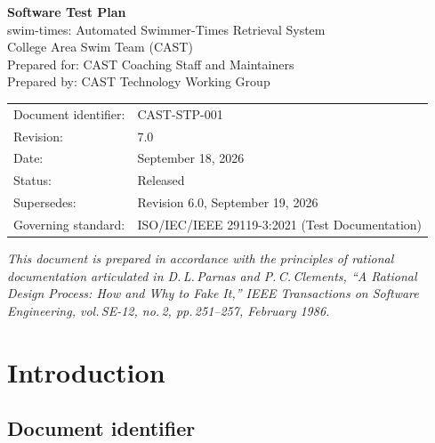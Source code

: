 \documentclass[12pt]{article}
\begin{document}
\begin{titlepage}
  \centering
  \vspace*{2cm}
  {\Huge\bfseries\color{castblue} Software Test Plan\\[0.5em]}
  {\Large swim-times: Automated Swimmer-Times Retrieval System}\\[2em]
  {\large College Area Swim Team (CAST)}\\[0.5em]
  {\normalsize Prepared for: CAST Coaching Staff and Maintainers}\\[0.5em]
  {\normalsize Prepared by: CAST Technology Working Group}\\[2em]
  \begin{tabular}{ll}
    Document identifier: & CAST-STP-001                                       \\
    Revision:            & 7.0                                                \\
    Date:                & September 18, 2026                                 \\
    Status:              & Released                                           \\
    Supersedes:          & Revision 6.0, September 19, 2026                    \\
    Governing standard:  & ISO/IEC/IEEE 29119-3:2021 (Test Documentation)     \\
  \end{tabular}
  \vfill
  {\small\textit{This document is prepared in accordance with the principles
  of rational documentation articulated in D.\,L.\,Parnas and P.\,C.\,Clements,
  ``A Rational Design Process: How and Why to Fake It,''
  \textit{IEEE Transactions on Software Engineering}, vol.\,SE-12, no.\,2,
  pp.\,251--257, February 1986.}}
\end{titlepage}

\tableofcontents
\clearpage

\section{Introduction}

\subsection{Document identifier}
\end{document}
